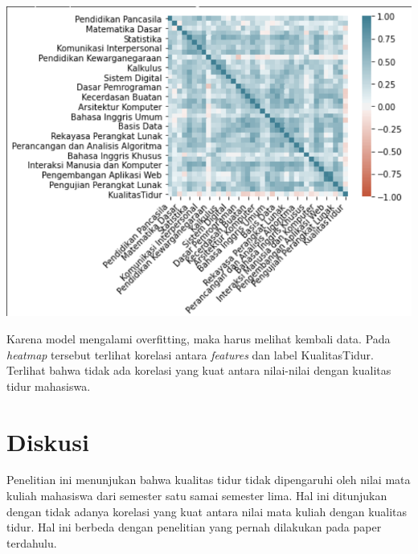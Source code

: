 \documentclass[12pt, a4paper]{article}
\begin{document}
\begin{multicols}{2}
\centering
\vspace{0.2cm}
\includegraphics[scale=0.22]{heatmap}
\vspace{0.2cm}

\justifying
Karena model mengalami overfitting, maka harus melihat kembali data. Pada \textit{heatmap} tersebut terlihat korelasi antara \textit{features} dan label KualitasTidur. Terlihat bahwa tidak ada korelasi yang kuat antara nilai-nilai dengan kualitas tidur mahasiswa.

\section{Diskusi}
Penelitian ini menunjukan bahwa kualitas tidur tidak dipengaruhi oleh nilai mata kuliah mahasiswa dari semester satu samai semester lima. Hal ini ditunjukan dengan tidak adanya korelasi yang kuat antara nilai mata kuliah dengan kualitas tidur. Hal ini berbeda dengan penelitian yang pernah dilakukan pada paper terdahulu.

\end{multicols}

\newpage
\printbibliography[title = Daftar Pustaka]
\end{document}
